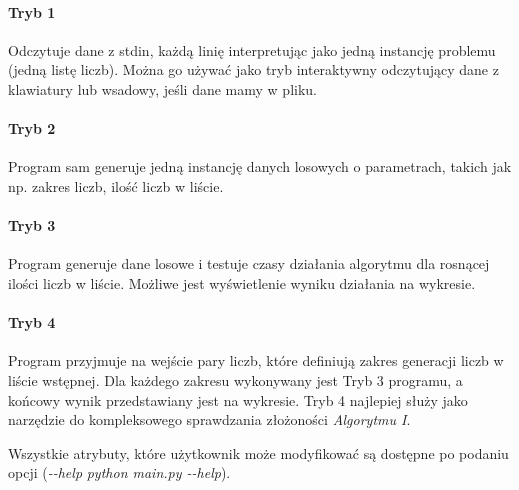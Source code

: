\documentclass[11pt]{article} %
\begin{document}
\paragraph{Tryb 1} Odczytuje dane z stdin, każdą linię interpretując jako jedną instancję problemu (jedną listę liczb). Można go używać jako tryb interaktywny odczytujący dane z klawiatury lub wsadowy, jeśli dane mamy w pliku.
\paragraph{Tryb 2} Program sam generuje jedną instancję danych losowych o parametrach, takich jak np. zakres liczb, ilość liczb w liście.
\paragraph{Tryb 3} Program generuje dane losowe i testuje czasy działania algorytmu dla rosnącej ilości liczb w liście. Możliwe jest wyświetlenie wyniku działania na wykresie.
\paragraph{Tryb 4} Program przyjmuje na wejście pary liczb, które definiują zakres generacji liczb w liście wstępnej. Dla każdego zakresu wykonywany jest Tryb 3 programu, a końcowy wynik przedstawiany jest na wykresie. Tryb 4 najlepiej służy jako narzędzie do kompleksowego sprawdzania złożoności \textsl{Algorytmu I}.

Wszystkie atrybuty, które użytkownik może modyfikować są dostępne po podaniu opcji (\textsl{-\phantom{}-help} \textsl{python main.py -\phantom{}-help}).
\end{document}
